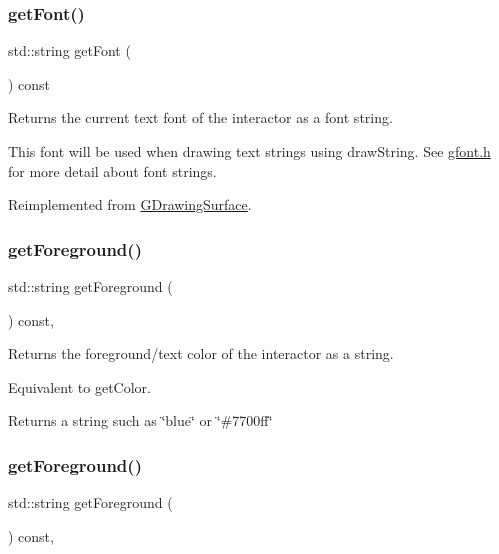 \subsubsection{\texorpdfstring{get\+Font()}{getFont()}}
{\footnotesize\ttfamily std\+::string get\+Font (\begin{DoxyParamCaption}{ }\end{DoxyParamCaption}) const\hspace{0.3cm}{\ttfamily [virtual]}}



Returns the current text font of the interactor as a font string. 

This font will be used when drawing text strings using draw\+String. See \mbox{\hyperlink{gfont_8h_source}{gfont.\+h}} for more detail about font strings. 

Reimplemented from \mbox{\hyperlink{classGDrawingSurface_a894a5502900794eeb27d084c21f1d77d}{G\+Drawing\+Surface}}.

\mbox{\label{classGInteractor_a4fa2d8b0192a3a5b4af4bbfe71194d03}} 
\subsubsection{\texorpdfstring{get\+Foreground()}{getForeground()}\hspace{0.1cm}{\footnotesize\ttfamily [1/2]}}
{\footnotesize\ttfamily std\+::string get\+Foreground (\begin{DoxyParamCaption}{ }\end{DoxyParamCaption}) const\hspace{0.3cm}{\ttfamily [virtual]}, {\ttfamily [inherited]}}



Returns the foreground/text color of the interactor as a string. 

Equivalent to get\+Color. \begin{DoxyReturn}{Returns}
a string such as \char`\"{}blue\char`\"{} or \char`\"{}\#7700ff\char`\"{} 
\end{DoxyReturn}
\mbox{\label{classGDrawingSurface_a4fa2d8b0192a3a5b4af4bbfe71194d03}} 
\subsubsection{\texorpdfstring{get\+Foreground()}{getForeground()}\hspace{0.1cm}{\footnotesize\ttfamily [2/2]}}
{\footnotesize\ttfamily std\+::string get\+Foreground (\begin{DoxyParamCaption}{ }\end{DoxyParamCaption}) const\hspace{0.3cm}{\ttfamily [virtual]}, {\ttfamily [inherited]}}



